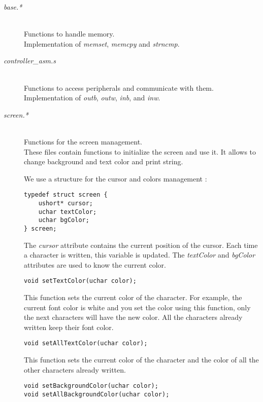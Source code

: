 \documentclass[a4paper]{article}
\begin{document}
\begin{description}
\item[\textit{base.*}] \hfill \\
Functions to handle memory.\\
Implementation of \textit{memset}, \textit{memcpy} and \textit{strncmp}.

\item[\textit{controller\_asm.s}] \hfill \\
Functions to access peripherals and communicate with them.\\
Implementation of \textit{outb}, \textit{outw}, \textit{inb}, and \textit{inw}.

\item[\textit{screen.*}] \hfill \\
Functions for the screen management.\\
These files contain functions to initialize the screen and use it. It allows to change background and text color and print string.

We use a structure for the cursor and colors management :

\begin{verbatim}
typedef struct screen {
    ushort* cursor;
    uchar textColor;
    uchar bgColor;
} screen;
\end{verbatim}

The \textit{cursor} attribute contains the current position of the cursor.
Each time a character is written, this variable is updated.
The \textit{textColor} and \textit{bgColor} attributes are used to know the current color. 

\begin{verbatim}
void setTextColor(uchar color);
\end{verbatim}

This function sets the current color of the character. For example, the current font color is white and you set the color using this function, only the next characters will have the new color. All the characters already written keep their font color.  

\begin{verbatim}
void setAllTextColor(uchar color);
\end{verbatim}

This function sets the current color of the character and the color of all the other characters already written.

\begin{verbatim}
void setBackgroundColor(uchar color);
void setAllBackgroundColor(uchar color);
\end{verbatim}


\end{description}
\end{document}
